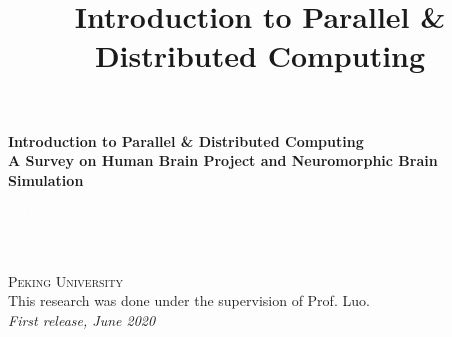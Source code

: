 \documentclass[11pt,fleqn]{book} %
\begin{document}
\title{Introduction to
Parallel & Distributed Computing}


\begingroup
\thispagestyle{empty}
\centering
\vspace*{5cm}
\par\normalfont\fontsize{32}{32}\sffamily\selectfont
\textbf{Introduction to
Parallel \& Distributed Computing}\\
\vspace*{1cm}
{\LARGE \textbf{A Survey on Human Brain Project and Neuromorphic Brain Simulation}}\par %
\vspace*{8cm}
{\textcolor{white}{\Huge Yifan Zhang}}\par %
\endgroup


\newpage
~\vfill
\thispagestyle{empty}


\noindent \textsc{Peking University}\\

\noindent This research was done under the supervision of Prof. Luo.\\ %

\noindent \textit{First release, June 2020} %



\pagestyle{empty} %

\tableofcontents %

\end{document}
